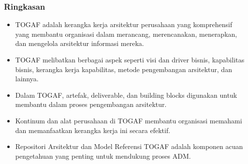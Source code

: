 \documentclass[aspectratio=169]{beamer}
\begin{document}
	\begin{frame}
		\frametitle{Ringkasan}
		\begin{itemize}
			\item TOGAF adalah kerangka kerja arsitektur perusahaan yang komprehensif yang membantu organisasi dalam merancang, merencanakan, menerapkan, dan mengelola arsitektur informasi mereka.
			\item TOGAF melibatkan berbagai aspek seperti visi dan driver bisnis, kapabilitas bisnis, kerangka kerja kapabilitas, metode pengembangan arsitektur, dan lainnya.
			\item Dalam TOGAF, artefak, deliverable, dan building blocks digunakan untuk membantu dalam proses pengembangan arsitektur.
			\item Kontinum dan alat perusahaan di TOGAF membantu organisasi memahami dan memanfaatkan kerangka kerja ini secara efektif.
			\item Repositori Arsitektur dan Model Referensi TOGAF adalah komponen acuan pengetahuan yang penting untuk mendukung proses ADM.
		\end{itemize}
	\end{frame}
	
\end{document}
